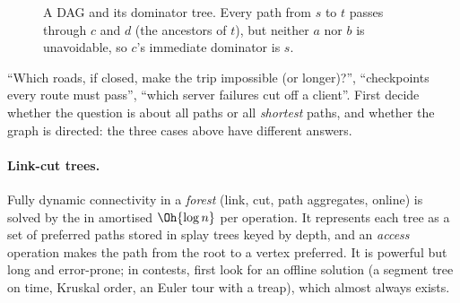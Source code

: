 \begin{figure}[htbp]
\centering
{}
\caption{A DAG and its dominator tree. Every path from $s$ to $t$ passes through $c$ and $d$ (the ancestors of $t$), but neither
$a$ nor $b$ is unavoidable, so $c$'s immediate dominator is $s$.}
\label{fig:dominator}
\end{figure}

\begin{recognize}
``Which roads, if closed, make the trip impossible (or longer)?'', ``checkpoints every route must pass'', ``which server failures
cut off a client''. First decide whether the question is about all paths or all \emph{shortest} paths, and whether the graph is
directed: the three cases above have different answers.
\end{recognize}

\paragraph{Link-cut trees.} Fully dynamic connectivity in a \emph{forest} (link, cut, path aggregates, online) is solved by the
 in amortised $\Oh{\log n}$ per operation. It represents each tree as a set of preferred paths stored in splay
trees keyed by depth, and an \emph{access} operation makes the path from the root to a vertex preferred. It is powerful but long and
error-prone; in contests, first look for an offline solution (a segment tree on time, Kruskal order, an Euler tour with a treap),
which almost always exists.

